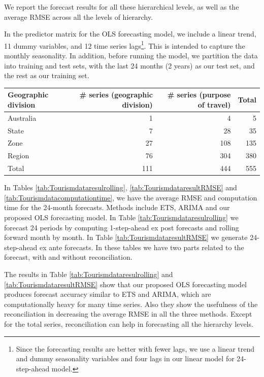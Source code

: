 \documentclass[11pt,a4paper,]{article}
\let\origtable\table
\let\endorigtable\endtable
\renewenvironment{table}[1][2] {
    \expandafter\origtable\expandafter[htbp]
} {
    \endorigtable
}
\begin{document}
We report the forecast results for all these hierarchical levels, as well as the average RMSE across all the levels of hierarchy.

In the predictor matrix for the OLS forecasting model, we include a linear trend, 11 dummy variables, and 12 time series lags\footnote{Since the forecasting results are better with fewer lags, we use a linear trend and dummy seasonality variables and four lags in our linear model for 24-step-ahead model.}. This is intended to capture the monthly seasonality. In addition, before running the model, we partition the data into training and test sets, with the last 24 months (2 years) as our test set, and the rest as our training set.


\begin{table}[t]

\caption{\label{tab:Australiageographicalpurposedivision}Number of Australian domestic tourism series in each level of hierarchy and group structure.}
\centering
\begin{tabular}{lrrr}
\toprule
Geographic division & \# series (geographic division) & \# series (purpose of travel) & Total\\
\midrule
Australia & 1 & 4 & 5\\
State & 7 & 28 & 35\\
Zone & 27 & 108 & 135\\
Region & 76 & 304 & 380\\
Total & 111 & 444 & 555\\
\bottomrule
\end{tabular}
\end{table}

In Tables \ref{tab:Tourismdataresulrolling}, \ref{tab:TourismdataresultRMSE} and \ref{tab:Tourismdatacomputationtime}, we have the average RMSE and computation time for the 24-month forecasts. Methods include ETS, ARIMA and our proposed OLS forecasting model. In Table \ref{tab:Tourismdataresulrolling} we forecast 24 periods by computing 1-step-ahead ex post forecasts and rolling forward month by month. In Table \ref{tab:TourismdataresultRMSE} we generate 24-step-ahead ex ante forecasts. In these tables we have two parts related to the forecast, with and without reconciliation.

The results in Table \ref{tab:Tourismdataresulrolling} and \ref{tab:TourismdataresultRMSE} show that our proposed OLS forecasting model produces forecast accuracy similar to ETS and ARIMA, which are computationally heavy for many time series. Also they show the usefulness of the reconciliation in decreasing the average RMSE in all the three methods. Except for the total series, reconciliation can help in forecasting all the hierarchy levels.
\end{document}

